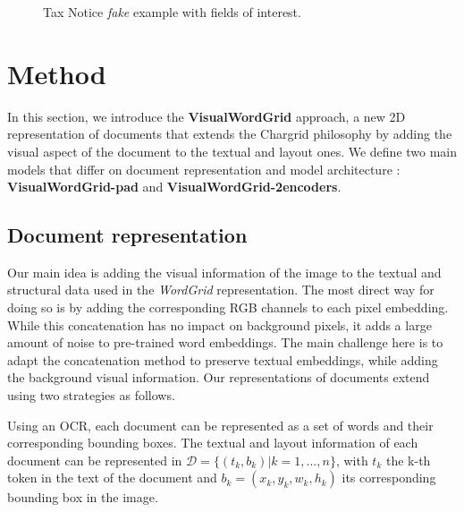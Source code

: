 \documentclass[runningheads]{llncs}
\begin{document}
\begin{figure}[!h]
\begin{minipage}[t]{0.5\linewidth}
    \centering
     {\setlength{\fboxsep}{0pt}\setlength{\fboxrule}{1pt}}\label{f21}
\end{minipage}
\hspace{0.1cm}
\begin{minipage}[t]{0.5\linewidth} 
    \centering
     {\setlength{\fboxsep}{0pt}\setlength{\fboxrule}{1pt}}\label{f2}
\end{minipage}     
\caption{Tax Notice \textit{fake} example with fields of interest.}
\label{fig:tax}
\end{figure}  



\section{Method}

In this section, we introduce the \textbf{VisualWordGrid} approach, a new 2D representation of documents that extends the Chargrid philosophy by adding the visual aspect of the document to the textual and layout ones. We define two main models that differ on document representation and model architecture : \textbf{VisualWordGrid-pad} and \textbf{VisualWordGrid-2encoders}.


\subsection{Document representation}
Our main idea is adding the visual information of the image to the textual and structural data used in the \textit{WordGrid} representation. The most direct way for doing so is by adding the corresponding RGB channels to each pixel embedding. While this concatenation has no impact on background pixels, it adds a large amount of noise to pre-trained word embeddings. The main challenge here is to adapt the concatenation method to preserve textual embeddings, while adding the background visual information. Our representations of documents extend \cite{chargrid} using two strategies as follows.

Using an OCR, each document can be represented as a set of words and their corresponding bounding boxes. The textual and layout information of each document can be represented in  $ \mathcal{D} = \{(t_k,b_k) | k= 1,...,n\}$, with $t_k$ the k-th token in the text of the document and $b_k = (x_k, y_k, w_k, h_k)$ its corresponding bounding box in the image.
\end{document}
